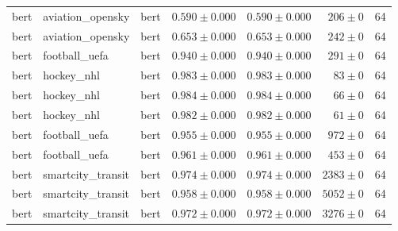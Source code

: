\begin{table}[htbp]
\begin{tabular}{l l l r r r r}
bert & aviation\_opensky & bert & $0.590\pm0.000$ & $0.590\pm0.000$ & $206\pm0$ & 64 \\
bert & aviation\_opensky & bert & $0.653\pm0.000$ & $0.653\pm0.000$ & $242\pm0$ & 64 \\
bert & football\_uefa & bert & $0.940\pm0.000$ & $0.940\pm0.000$ & $291\pm0$ & 64 \\
bert & hockey\_nhl & bert & $0.983\pm0.000$ & $0.983\pm0.000$ & $83\pm0$ & 64 \\
bert & hockey\_nhl & bert & $0.984\pm0.000$ & $0.984\pm0.000$ & $66\pm0$ & 64 \\
bert & hockey\_nhl & bert & $0.982\pm0.000$ & $0.982\pm0.000$ & $61\pm0$ & 64 \\
bert & football\_uefa & bert & $0.955\pm0.000$ & $0.955\pm0.000$ & $972\pm0$ & 64 \\
bert & football\_uefa & bert & $0.961\pm0.000$ & $0.961\pm0.000$ & $453\pm0$ & 64 \\
bert & smartcity\_transit & bert & $0.974\pm0.000$ & $0.974\pm0.000$ & $2383\pm0$ & 64 \\
bert & smartcity\_transit & bert & $0.958\pm0.000$ & $0.958\pm0.000$ & $5052\pm0$ & 64 \\
bert & smartcity\_transit & bert & $0.972\pm0.000$ & $0.972\pm0.000$ & $3276\pm0$ & 64 \\
\hline
\end{tabular}
\end{table}
